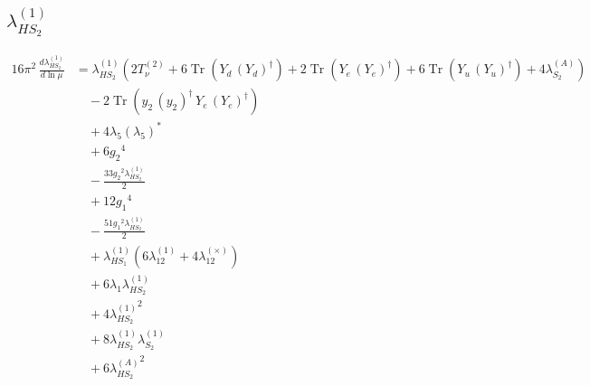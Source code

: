 \documentclass[10pt,a4paper]{article}
\begin{document}
\subsection*{$\lambda_{HS_2}^{(1)}$}
\begin{align*}
16\pi^2\,\frac{d \lambda_{HS_2}^{(1)}}{d\ln\mu} &={\lambda_{HS_2}^{(1)}} (2 T_{\nu}^{(2)}+6 \operatorname{Tr}\!\left({Y_d}\,\left({Y_d}\right)^{\dagger}\right)+2 \operatorname{Tr}\!\left({Y_e}\,\left({Y_e}\right)^{\dagger}\right)+6 \operatorname{Tr}\!\left({Y_u}\,\left({Y_u}\right)^{\dagger}\right)+4 {\lambda_{S_2}^{(A)}}) \\
&\quad -2 \operatorname{Tr}\!\left({y_2}\,\left({y_2}\right)^{\dagger}\,{Y_e}\,\left({Y_e}\right)^{\dagger}\right) \\
&\quad +4 {\lambda_5} \left({\lambda_5}\right)^{*} \\
&\quad +6 {g_2}^4 \\
&\quad -\frac{33 {g_2}^2 {\lambda_{HS_2}^{(1)}}}{2} \\
&\quad +12 {g_1}^4 \\
&\quad -\frac{51 {g_1}^2 {\lambda_{HS_2}^{(1)}}}{2} \\
&\quad +{\lambda_{HS_1}^{(1)}} (6 {\lambda_{12}^{(1)}}+4 {\lambda_{12}^{(\times)}}) \\
&\quad +6 {\lambda_1} {\lambda_{HS_2}^{(1)}} \\
&\quad +4 {\lambda_{HS_2}^{(1)}}^2 \\
&\quad +8 {\lambda_{HS_2}^{(1)}} {\lambda_{S_2}^{(1)}} \\
&\quad +6 {\lambda_{HS_2}^{(A)}}^2 \\
\end{align*}
\end{document}
